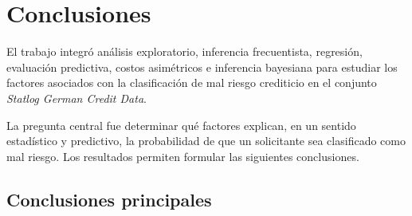 \section{Conclusiones}
\label{sec:conclusiones}

El trabajo integró análisis exploratorio, inferencia frecuentista,
regresión, evaluación predictiva, costos asimétricos e inferencia
bayesiana para estudiar los factores asociados con la clasificación de
mal riesgo crediticio en el conjunto
\textit{Statlog German Credit Data}.

La pregunta central fue determinar qué factores explican, en un sentido
estadístico y predictivo, la probabilidad de que un solicitante sea
clasificado como mal riesgo. Los resultados permiten formular las
siguientes conclusiones.

\subsection{Conclusiones principales}

